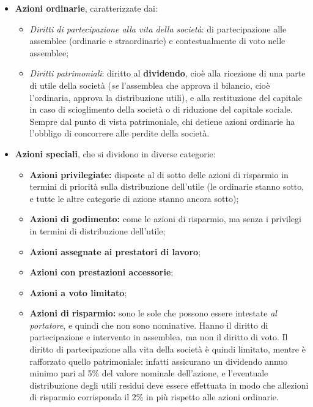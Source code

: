 \documentclass[a4paper,11pt]{article}
\begin{document}
\begin{itemize}
	\item \textbf{Azioni ordinarie}, caratterizzate dai:
	\begin{itemize}
		\item \textit{Diritti di partecipazione alla vita della società}: di partecipazione alle assemblee (ordinarie e straordinarie) e contestualmente di voto nelle assemblee;
		\item \textit{Diritti patrimoniali}: diritto al \textbf{dividendo}, cioè alla ricezione di una parte di utile della società (\textit{se} l'assemblea che approva il bilancio, cioè l'ordinaria, approva la distribuzione utili), e alla restituzione del capitale in caso di scioglimento della società o di riduzione del capitale sociale.
			Sempre dal punto di vista patrimoniale, chi detiene azioni ordinarie ha l'obbligo di concorrere alle perdite della società. 
	\end{itemize}
	\item \textbf{Azioni speciali}, che si dividono in diverse categorie:
		\begin{itemize}
			\item \textbf{Azioni privilegiate:} disposte al di sotto delle azioni di risparmio in termini di priorità sulla distribuzione dell'utile (le ordinarie stanno sotto, e tutte le altre categorie di azione stanno ancora sotto); 
			\item \textbf{Azioni di godimento:} come le azioni di risparmio, ma senza i privilegi in termini di distribuzione dell'utile;
			\item \textbf{Azioni assegnate ai prestatori di lavoro};
			\item \textbf{Azioni con prestazioni accessorie};
			\item \textbf{Azioni a voto limitato};
			\item \textbf{Azioni di risparmio:} sono le sole che possono essere intestate \textit{al portatore}, e quindi che non sono nominative.
				Hanno il diritto di partecipazione e intervento in assemblea, ma non il diritto di voto.
				Il diritto di partecipazione alla vita della società è quindi limitato, mentre è rafforzato quello patrimoniale: infatti assicurano un dividendo annuo minimo pari al 5\% del valore nominale dell'azione, e l'eventuale distribuzione degli utili residui deve essere effettuata in modo che allezioni di risparmio corrisponda il 2\% in più rispetto alle azioni ordinarie.


\end{itemize}
\end{itemize}
\end{document}
